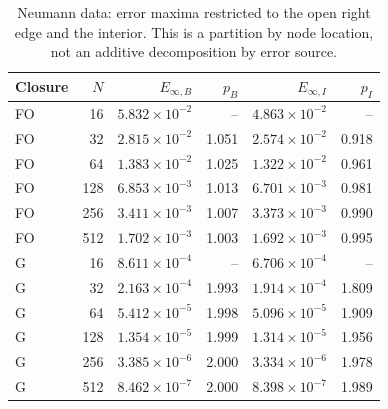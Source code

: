 \begin{table}[htbp]
\centering
\small
\setlength{\tabcolsep}{4pt}
\begin{tabular}{lrrrrr}
\toprule
Closure & $N$ & $E_{\infty,B}$ & $p_B$ & $E_{\infty,I}$ & $p_I$ \\
\midrule
FO & 16 & $5.832\times10^{-2}$ & -- & $4.863\times10^{-2}$ & -- \\
FO & 32 & $2.815\times10^{-2}$ & 1.051 & $2.574\times10^{-2}$ & 0.918 \\
FO & 64 & $1.383\times10^{-2}$ & 1.025 & $1.322\times10^{-2}$ & 0.961 \\
FO & 128 & $6.853\times10^{-3}$ & 1.013 & $6.701\times10^{-3}$ & 0.981 \\
FO & 256 & $3.411\times10^{-3}$ & 1.007 & $3.373\times10^{-3}$ & 0.990 \\
FO & 512 & $1.702\times10^{-3}$ & 1.003 & $1.692\times10^{-3}$ & 0.995 \\
G & 16 & $8.611\times10^{-4}$ & -- & $6.706\times10^{-4}$ & -- \\
G & 32 & $2.163\times10^{-4}$ & 1.993 & $1.914\times10^{-4}$ & 1.809 \\
G & 64 & $5.412\times10^{-5}$ & 1.998 & $5.096\times10^{-5}$ & 1.909 \\
G & 128 & $1.354\times10^{-5}$ & 1.999 & $1.314\times10^{-5}$ & 1.956 \\
G & 256 & $3.385\times10^{-6}$ & 2.000 & $3.334\times10^{-6}$ & 1.978 \\
G & 512 & $8.462\times10^{-7}$ & 2.000 & $8.398\times10^{-7}$ & 1.989 \\
\bottomrule
\end{tabular}
\caption{Neumann data: error maxima restricted to the open right edge and the interior. This is a partition by node location, not an additive decomposition by error source.}
\label{tab:spatial-neumann}
\end{table}
